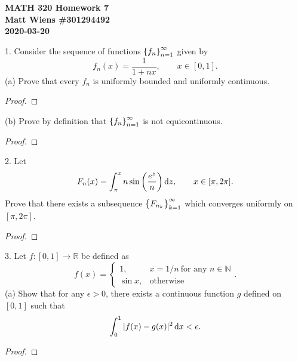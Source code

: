 \documentclass{article}
\newcommand{\N}{\mathbb{N}}
\newcommand{\R}{\mathbb{R}}
\begin{document}
\textbf{MATH 320 Homework 7} \\
\textbf{Matt Wiens \#301294492} \\
\textbf{2020-03-20}

1. Consider the sequence of functions $\cbr{f_n}_{ n =1}^\infty$ given
by
%
\begin{equation*}
    f_n(x)  = \frac{1}{1 + n x},
    \qquad
    x \in [0, 1]
    .
\end{equation*}
%
(a) Prove that every $f_n$ is uniformly bounded and uniformly continuous.

\begin{proof}

\end{proof}

(b) Prove by definition that $\cbr{f_n}_{n = 1}^\infty$ is not
equicontinuous.

\begin{proof}

\end{proof}

\newpage

2. Let
%
\begin{equation*}
    F_n(x) = \int_\pi^x n \sin \del{\frac{e^z}{n}} \dif z,
    \qquad
    x \in [\pi, 2 \pi]
    .
\end{equation*}
%
Prove that there exists a subsequence $\cbr{F_{n_k}}_{k = 1}^\infty$
which converges uniformly on $[\pi, 2 \pi]$.

\begin{proof}

\end{proof}

\newpage

3. Let $f: [0, 1] \to \R$ be defined as
%
\begin{equation*}
    f(x)
    = \begin{cases}
        1, & x = 1/n \ \text{for any $n \in \N$} \\
        \sin x, & \text{otherwise}
    \end{cases}
    .
\end{equation*}
%
(a) Show that for any $\epsilon > 0$, there exists a continuous function
$g$ defined on $[0, 1]$ such that
%
\begin{equation*}
    \int_0^1 |f(x) - g(x)|^2 \dif x < \epsilon
    .
\end{equation*}

\begin{proof}

\end{proof}
\end{document}
